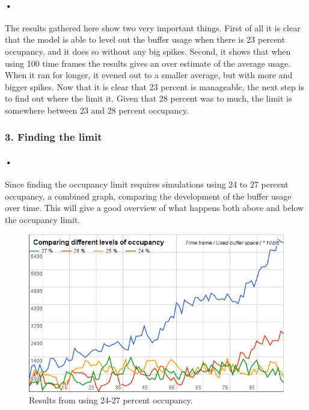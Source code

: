 \documentclass[a4paper, 12pt]{report}\dfrac{\right }{•}
\begin{document}
\paragraph{•}
The results gathered here show two very important things.
First of all it is clear that the model is able to level out the buffer usage when there is 23 percent occupancy, and it does so without any big spikes.
Second, it shows that when using 100 time frames the results gives an over estimate of the average usage.
When it ran for longer, it evened out to a smaller average, but with more and bigger spikes.
Now that it is clear that 23 percent is manageable, the next step is to find out where the limit it.
Given that 28 percent was to much, the limit is somewhere between 23 and 28 percent occupancy.

\subsubsection{3. Finding the limit} %

\paragraph{•}
Since finding the occupancy limit requires simulations using 24 to 27 percent occupancy, a combined graph, comparing the development of the buffer usage over time.
This will give a good overview of what happens both above and below the occupancy limit.

\begin{figure}[h!]
	\centering
		\includegraphics[width=1.0\textwidth]{images/24-27-occ.png}
		\caption{Results from using 24-27 percent occupancy.}
		\label{fig:24-27-occ}
\end{figure}
\end{document}
